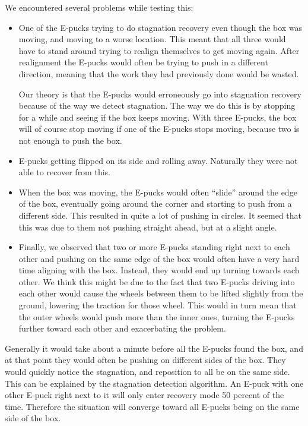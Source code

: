 \documentclass[a4paper,12pt]{article}
\begin{document}
We encountered several problems while testing this:
\begin{itemize}
\item One of the E-pucks trying to do stagnation recovery even though the box was moving, and moving to a worse location. This meant that all three would have to stand around trying to realign themselves to get moving again. After realignment the E-pucks would often be trying to push in a different direction, meaning that the work they had previously done would be wasted. 

Our theory is that the E-pucks would erroneously go into stagnation recovery because of the way we detect stagnation. The way we do this is by stopping for a while and seeing if the box keeps moving. With three E-pucks, the box will of course stop moving if one of the E-pucks stops moving, because two is not enough to push the box.

\item E-pucks getting flipped on its side and rolling away. Naturally they were not able to recover from this.

\item When the box was moving, the E-pucks would often ``slide'' around the edge of the box, eventually going around the corner and starting to push from a different side. This resulted in quite a lot of pushing in circles. It seemed that this was due to them not pushing straight ahead, but at a slight angle.

\item Finally, we observed that two or more E-pucks standing right next to each other and pushing on the same edge of the box would often have a very hard time aligning with the box. Instead, they would end up turning towards each other. We think this might be due to the fact that two E-pucks driving into each other would cause the wheels between them to be lifted slightly from the ground, lowering the traction for those wheel. This would in turn mean that the outer wheels would push more than the inner ones, turning the E-pucks further toward each other and exacerbating the problem.
\end{itemize}

Generally it would take about a minute before all the E-pucks found the box, and at that point they would often be pushing on different sides of the box. They would quickly notice the stagnation, and reposition to all be on the same side. This can be explained by the stagnation detection algorithm. An E-puck with one other E-puck right next to it will only enter recovery mode 50 percent of the time. Therefore the situation will converge toward all E-pucks being on the same side of the box.
\end{document}
